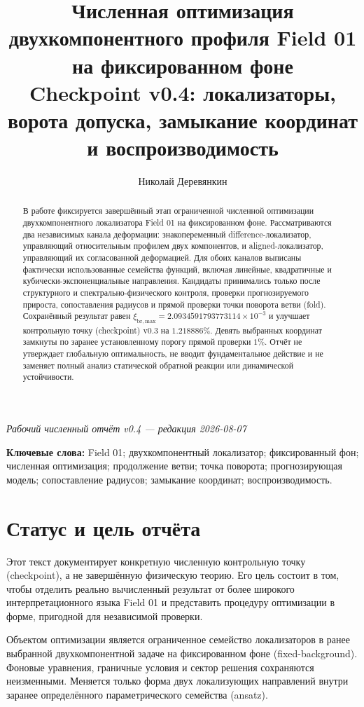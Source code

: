 \documentclass[11pt,a4paper]{article}
\title{Численная оптимизация двухкомпонентного профиля Field 01 на фиксированном фоне\\
\large Checkpoint v0.4: локализаторы, ворота допуска, замыкание координат и воспроизводимость}
\author{Николай Деревянкин}
\date{}
\newcommand{\xibr}{\xi_{\mathrm{br,max}}}
\begin{document}
\maketitle

\begin{center}
\textit{Рабочий численный отчёт v0.4 --- редакция 2026-08-07}
\end{center}

\begin{abstract}
В работе фиксируется завершённый этап ограниченной численной оптимизации двухкомпонентного локализатора Field 01 на фиксированном фоне. Рассматриваются два независимых канала деформации: знакопеременный difference-локализатор, управляющий относительным профилем двух компонентов, и aligned-локализатор, управляющий их согласованной деформацией. Для обоих каналов выписаны фактически использованные семейства функций, включая линейные, квадратичные и кубически-экспоненциальные направления. Кандидаты принимались только после структурного и спектрально-физического контроля, проверки прогнозируемого прироста, сопоставления радиусов и прямой проверки точки поворота ветви (fold). Сохранённый результат равен $\xibr=2.0934591793773114\times10^{-3}$ и улучшает контрольную точку (checkpoint) v0.3 на $1.218886\%$. Девять выбранных координат замкнуты по заранее установленному порогу прямой проверки $1\%$. Отчёт не утверждает глобальную оптимальность, не вводит фундаментальное действие и не заменяет полный анализ статической обратной реакции или динамической устойчивости.
\end{abstract}

\textbf{Ключевые слова:} Field 01; двухкомпонентный локализатор; фиксированный фон; численная оптимизация; продолжение ветви; точка поворота; прогнозирующая модель; сопоставление радиусов; замыкание координат; воспроизводимость.

\section{Статус и цель отчёта}

Этот текст документирует конкретную численную контрольную точку (checkpoint), а не завершённую физическую теорию. Его цель состоит в том, чтобы отделить реально вычисленный результат от более широкого интерпретационного языка Field 01 и представить процедуру оптимизации в форме, пригодной для независимой проверки.

Объектом оптимизации является ограниченное семейство локализаторов в ранее выбранной двухкомпонентной задаче на фиксированном фоне (fixed-background). Фоновые уравнения, граничные условия и сектор решения сохраняются неизменными. Меняется только форма двух локализующих направлений внутри заранее определённого параметрического семейства (ansatz).
\end{document}
